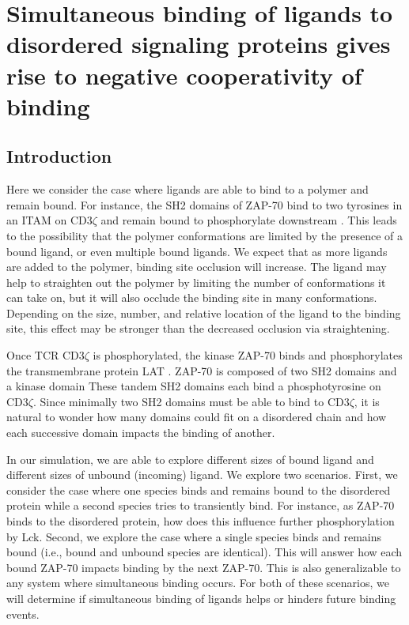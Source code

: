 \documentclass[../../AdvancementSummary.tex]{subfiles}
\begin{document}
\section{Simultaneous binding of ligands to disordered signaling proteins gives rise to negative cooperativity of binding}
\label{sec: SimultaneousBinding}
\subsection{Introduction}

Here we consider the case where ligands are able to bind to a polymer and remain bound. For instance, the SH2 domains of ZAP-70 bind to two tyrosines in an ITAM on CD3$\zeta$ and remain bound to phosphorylate downstream \cite{Wang2010}. This leads to the possibility that the polymer conformations are limited by the presence of a bound ligand, or even multiple bound ligands. We expect that as more ligands are added to the polymer, binding site occlusion will increase. The ligand may help to straighten out the polymer by limiting the number of conformations it can take on, but it will also occlude the binding site in many conformations. Depending on the size, number, and relative location of the ligand to the binding site, this effect may be stronger than the decreased occlusion via straightening. 

Once TCR CD3$\zeta$ is phosphorylated, the kinase ZAP-70 binds and phosphorylates the transmembrane protein LAT \cite{Chan1992, Zhang1998}. ZAP-70 is composed of two SH2 domains and a kinase domain \cite{Chan1992, Wang2010} These tandem SH2 domains each bind a phosphotyrosine on CD3$\zeta$. Since minimally two SH2 domains must be able to bind to CD3$\zeta$, it is natural to wonder how many domains could fit on a disordered chain and how each successive domain impacts the binding of another. 

In our simulation, we are able to explore different sizes of bound ligand and different sizes of unbound (incoming) ligand. We explore two scenarios. First, we consider the case where one species binds and remains bound to the disordered protein while a second species tries to transiently bind. For instance, as ZAP-70 binds to the disordered protein, how does this influence further phosphorylation by Lck. Second, we explore the case where a single species binds and remains bound (i.e., bound and unbound species are identical). This will answer how each bound ZAP-70 impacts binding by the next ZAP-70. This is also generalizable to any system where simultaneous binding occurs. For both of these scenarios, we will determine if simultaneous binding of ligands helps or hinders future binding events. 
\end{document}
